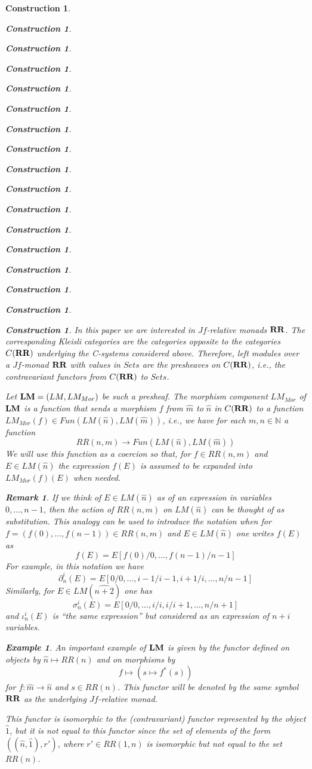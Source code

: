 \documentclass[onecolumn,12pt]{amsart}
\newtheorem{example}[proposition]{Example}
\newtheorem{remark}[proposition]{Remark}
\numberwithin{proposition}{subsection}
\newtheorem{construction}[proposition]{Construction}
\newcommand{\sr}{\rightarrow}
\newcommand{\nn}{{\mathbb N}}
\newcommand{\nat}{\nn}
\newcommand{\wh}{\widehat}
\newcommand{\mbind}[1]{{#1^*}}
\newcommand{\RR}{{\bf RR}}
\newcommand{\LM}{{\bf LM}}
\begin{document}
\begin{construction}
\begin{construction}
\begin{construction}
\begin{construction}
\begin{construction}
\begin{construction}
\begin{construction}
\begin{construction}
\begin{construction}
\begin{construction}
\begin{construction}
\begin{construction}
\begin{construction}
\begin{construction}
\begin{construction}
\begin{construction}
\begin{construction}
In this paper we are interested in $Jf$-relative monads $\RR$. The
corresponding Kleisli categories are the categories opposite to the categories
$C(\RR)$ underlying the C-systems considered above. Therefore, left modules
over a $Jf$-monad $\RR$ with values in $Sets$ are the presheaves on $C(\RR)$,
i.e., the contravariant functors from $C(\RR)$ to $Sets$.

Let $\LM=(LM,LM_{Mor})$ be such a presheaf.
%
%
The morphism component $LM_{Mor}$ of $\LM$ is a function that sends a morphism
$f$ from $\wh{m}$ to $\wh{n}$ in $C(\RR)$ to a function $LM_{Mor}(f)\in
Fun(LM(\wh{n}),LM(\wh{m}))$, i.e., we have for each $m,n\in\nat$ a function
%
$$RR(n,m)\sr Fun(LM(\wh{n}),LM(\wh{m}))$$
%
%
We will use this function as a coercion so that, for $f\in RR(n,m)$ and $E\in
LM(\wh{n})$ the expression $f(E)$ is assumed to be expanded into
$LM_{Mor}(f)(E)$ when needed.
%
\begin{remark}\rm
\label{2015.08.18.rem1} 
If we think of $E\in LM(\wh{n})$ as of an expression
in variables $0,\dots,n-1$, then the action of $RR(n,m)$ on $LM(\wh{n})$ can be
thought of as substitution. This analogy can be used to introduce the
notation when for $f=(f(0),\dots,f(n-1))\in RR(n,m)$ and $E\in LM(\wh{n})$ one
writes $f(E)$ as
%
$$f(E)=E[f(0)/0,\dots,f(n-1)/n-1]$$
%
For example, in this notation we have 
%
$$\partial^i_n(E)=E[0/0,\dots,i-1/i-1,i+1/i,\dots,n/n-1]$$
%
Similarly, for $E\in LM(\wh{n+2})$ one has
%
$$\sigma^i_n(E)=E[0/0,\dots,i/i,i/i+1,\dots,n/n+1]$$
%
and $\iota_n^i(E)$ is ``the same expression'' but considered as an expression of $n+i$ variables.
\end{remark}
%
\begin{example}\rm
\label{2015.09.07.rem3} 
An important example of $\LM$ is given by the functor
defined on objects by $\wh{n}\mapsto RR(n)$ and on morphisms by
%
$$f\mapsto (s\mapsto\mbind{f}(s))$$
%
for $f:\wh{m}\sr \wh{n}$ and $s\in RR(n)$.  This functor will be denoted by the
same symbol $\RR$ as the underlying $Jf$-relative monad.

This functor is isomorphic to the (contravariant) functor represented by the
object $\wh{1}$, but it is not equal to this functor since the set of elements
of the form $((\wh{n},\wh{1}),r')$, where $r'\in RR(1,n)$ is isomorphic but not
equal to the set $RR(n)$.
\end{example}


\end{construction}
\end{construction}
\end{construction}
\end{construction}
\end{construction}
\end{construction}
\end{construction}
\end{construction}
\end{construction}
\end{construction}
\end{construction}
\end{construction}
\end{construction}
\end{construction}
\end{construction}
\end{construction}
\end{construction}
\end{document}

